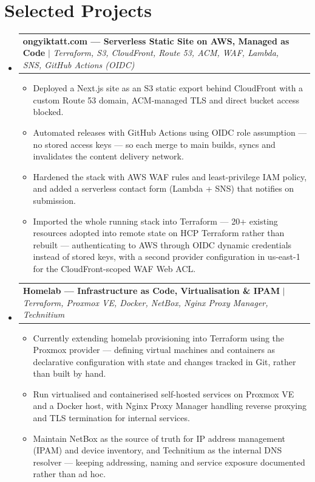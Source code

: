 \documentclass[a4paper,10pt]{article}
\makeatletter
\newcommand{\resumeItem}[1]{
  \item{#1}
}
\newcommand{\resumeProjectHeading}[2]{
    \needspace{7\baselineskip}\item
    \begin{tabularx}{0.97\textwidth}{@{}>{\raggedright\arraybackslash}X@{}r@{}}
      \small#1 & #2 \\
    \end{tabularx}\vspace{-7pt}
}
\newcommand{\resumeSubHeadingListStart}{\begin{itemize}[leftmargin=0.15in, label={}]}
\newcommand{\resumeSubHeadingListEnd}{\end{itemize}}
\newcommand{\resumeItemListStart}{\begin{itemize}[itemsep=0pt, parsep=0pt]\small}
\newcommand{\resumeItemListEnd}{\end{itemize}\vspace{-5pt}}
\makeatother
\begin{document}
\section{Selected Projects}
  \resumeSubHeadingListStart
    \resumeProjectHeading
      {\textbf{ongyiktatt.com --- Serverless Static Site on AWS, Managed as Code} $|$ \emph{Terraform, S3, CloudFront, Route 53, ACM, WAF, Lambda, SNS, GitHub Actions (OIDC)}}
      {}
      \resumeItemListStart
        \resumeItem{Deployed a Next.js site as an S3 static export behind CloudFront with a custom Route 53 domain, ACM-managed TLS and direct bucket access blocked.}
        \resumeItem{Automated releases with GitHub Actions using OIDC role assumption --- no stored access keys --- so each merge to main builds, syncs and invalidates the content delivery network.}
        \resumeItem{Hardened the stack with AWS WAF rules and least-privilege IAM policy, and added a serverless contact form (Lambda + SNS) that notifies on submission.}
        \resumeItem{Imported the whole running stack into Terraform --- 20+ existing resources adopted into remote state on HCP Terraform rather than rebuilt --- authenticating to AWS through OIDC dynamic credentials instead of stored keys, with a second provider configuration in us-east-1 for the CloudFront-scoped WAF Web ACL.}
      \resumeItemListEnd
    \resumeProjectHeading
      {\textbf{Homelab --- Infrastructure as Code, Virtualisation \& IPAM} $|$ \emph{Terraform, Proxmox VE, Docker, NetBox, Nginx Proxy Manager, Technitium}}
      {}
      \resumeItemListStart
        \resumeItem{Currently extending homelab provisioning into Terraform using the Proxmox provider --- defining virtual machines and containers as declarative configuration with state and changes tracked in Git, rather than built by hand.}
        \resumeItem{Run virtualised and containerised self-hosted services on Proxmox VE and a Docker host, with Nginx Proxy Manager handling reverse proxying and TLS termination for internal services.}
        \resumeItem{Maintain NetBox as the source of truth for IP address management (IPAM) and device inventory, and Technitium as the internal DNS resolver --- keeping addressing, naming and service exposure documented rather than ad hoc.}
      \resumeItemListEnd
  \resumeSubHeadingListEnd
%
\end{document}
